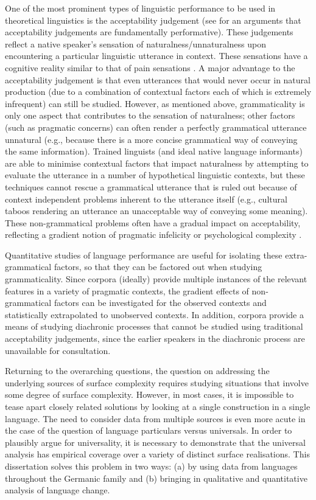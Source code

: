 One of the most prominent types of linguistic performance to be used in theoretical linguistics is the acceptability judgement (see \citealt{Stroud.2012,Phillips.2013, Phillips.2013b, Phillips.2013c} for an arguments that acceptability judgements are fundamentally performative). These judgements reflect a native speaker's sensation of naturalness/unnaturalness upon encountering a particular linguistic utterance in context. These sensations have a cognitive reality similar to that of pain sensations \citep{Schutze.2014}. A major advantage to the acceptability judgement is that even utterances that would never occur in natural production (due to a combination of contextual factors each of which is extremely infrequent) can still be studied. However, as mentioned above, grammaticality is only one aspect that contributes to the sensation of naturalness; other factors (such as pragmatic concerns) can often render a perfectly grammatical utterance unnatural (e.g., because there is a more concise grammatical way of conveying the same information). Trained linguists (and ideal native language informants) are able to minimise contextual factors that impact naturalness by attempting to evaluate the utterance in a number of hypothetical linguistic contexts, but these techniques cannot rescue a grammatical utterance that is ruled out because of context independent problems inherent to the utterance itself (e.g., cultural taboos rendering an utterance an unacceptable way of conveying some meaning). These non-grammatical problems often have a gradual impact on acceptability, reflecting a gradient notion of pragmatic infelicity or psychological complexity \citep{Bresnan.2007,Bresnan.2010,Schutze.2014}.

Quantitative studies of language performance are useful for isolating these extra-grammatical factors, so that they can be factored out when studying grammaticality. Since corpora (ideally) provide multiple instances of the relevant features in a variety of pragmatic contexts, the gradient effects of non-grammatical factors can be investigated for the observed contexts and statistically extrapolated to unobserved contexts. In addition, corpora provide a means of studying diachronic processes that cannot be studied using traditional acceptability judgements, since the earlier speakers in the diachronic process are unavailable for consultation. 

Returning to the overarching questions, the question on addressing the underlying sources of surface complexity requires studying situations that involve some degree of surface complexity. However, in most cases, it is impossible to tease apart closely related solutions by looking at a single construction in a single language. The need to consider data from multiple sources is even more acute in the case of the question of language particulars versus universals. In order to plausibly argue for universality, it is necessary to demonstrate that the universal analysis has empirical coverage over a variety of distinct surface realisations. This dissertation solves this problem in two ways: (a) by using data from languages throughout the Germanic family and (b) bringing in qualitative and quantitative analysis of language change.

